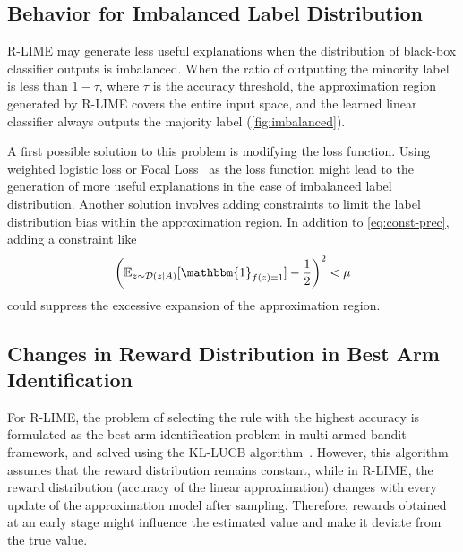 \documentclass[runningheads]{llncs}
\begin{document}
{\subsection{Behavior for Imbalanced Label Distribution}
R-LIME may generate less useful explanations
when the distribution of black-box classifier outputs is imbalanced.
When the ratio of outputting the minority label is less than $1-\tau$,
where $\tau$ is the accuracy threshold,
the approximation region generated by R-LIME covers the entire input space,
and the learned linear classifier always outputs the majority label
(\cref{fig:imbalanced}).

A first possible solution to this problem is modifying the loss function.
Using weighted logistic loss or Focal Loss~\cite{lin2020focal}
as the loss function might lead to the generation of more useful explanations
in the case of imbalanced label distribution.
Another solution involves adding constraints
to limit the label distribution bias within the approximation region.
In addition to \cref{eq:const-prec}, adding a constraint like
\begin{equation}
  {%
    \left(
    \mathbb{E}_{z\sim\mathcal{D}(z\mid A)}[\mathbbm{1}_{f(z)=1}]-\frac{1}{2}
    \right)
  }^2<\mu
\end{equation}
could suppress the excessive expansion of the approximation region.

\subsection{Changes in Reward Distribution in Best Arm Identification}\label{sec:reward}
{%
  \renewcommand{\arraystretch}{1.1}
  \begin{table}[tbp]
    \centering
    \caption[Deviation between the estimated accuracy and the true accuracy]{%
      Deviation between the estimated accuracy and the true accuracy
      of the linear classifier learned by R-LIME\@.
      The deviation $0.012\pm0.017$ was relatively small
      considering the confidence level $1-\delta=0.95$.
    }\label{tab:reward}
    
  \end{table}
}
For R-LIME,
the problem of selecting the rule with the highest accuracy is formulated
as the best arm identification problem in multi-armed bandit framework,
and solved using the KL-LUCB algorithm~\cite{kaufmann2013information}.
However, this algorithm assumes that the reward distribution remains constant,
while in R-LIME,
the reward distribution (accuracy of the linear approximation)
changes with every update of the approximation model after sampling.
Therefore, rewards obtained at an early stage
might influence the estimated value and
make it deviate from the true value.

}
\end{document}
